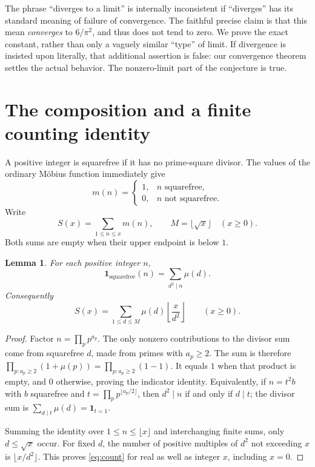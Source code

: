 \documentclass[11pt]{article}
\newtheorem{lemma}[theorem]{Lemma}
\newcommand{\sfcount}{S}
\newcommand{\mm}{m}
\begin{document}
The phrase ``diverges to a limit'' is internally inconsistent if
``diverges'' has its standard meaning of failure of convergence. The
faithful precise claim is that this mean \emph{converges} to $6/\pi^2$,
and thus does not tend to zero. We prove the exact constant, rather than
only a vaguely similar ``type'' of limit. If divergence is insisted upon
literally, that additional assertion is false: our convergence theorem
settles the actual behavior. The nonzero-limit part of the conjecture is
true.

\section{The composition and a finite counting identity}
A positive integer is squarefree if it has no prime-square divisor.
The values of the ordinary M\"obius function immediately give
\begin{equation}\label{eq:indicator}
\mm(n)=\begin{cases}1,&n\text{ squarefree},\\0,&n\text{ not squarefree}.
\end{cases}
\end{equation}
Write
\[
\sfcount(x)=\sum_{1\leq n\leq x}\mm(n),\qquad
M=\lfloor\sqrt{x}\rfloor\quad(x\geq0).
\]
Both sums are empty when their upper endpoint is below $1$.

\begin{lemma}\label{lem:divisor}
For each positive integer $n$,
\[
\mathbf 1_{\mathrm{squarefree}}(n)=\sum_{d^2\mid n}\mu(d).
\]
Consequently
\begin{equation}\label{eq:count}
\sfcount(x)=\sum_{1\leq d\leq M}\mu(d)
             \left\lfloor\frac{x}{d^2}\right\rfloor
\qquad(x\geq0).
\end{equation}
\end{lemma}
\begin{proof}
Factor $n=\prod_p p^{a_p}$. The only nonzero contributions to the divisor
sum come from squarefree $d$, made from primes with $a_p\geq2$.
The sum is therefore
$\prod_{p:a_p\geq2}(1+\mu(p))=\prod_{p:a_p\geq2}(1-1)$.
It equals $1$ when that product is empty, and $0$ otherwise, proving the
indicator identity. Equivalently, if $n=t^2b$ with $b$ squarefree and
$t=\prod_p p^{\lfloor a_p/2\rfloor}$, then $d^2\mid n$ if and only if
$d\mid t$; the divisor sum is $\sum_{d\mid t}\mu(d)=\mathbf1_{t=1}$.

Summing the identity over $1\leq n\leq\lfloor x\rfloor$ and interchanging
finite sums, only $d\leq\sqrt{x}$ occur. For fixed $d$, the number of
positive multiples of $d^2$ not exceeding $x$ is
$\lfloor x/d^2\rfloor$. This proves \eqref{eq:count} for real as well as
integer $x$, including $x=0$.
\end{proof}
\end{document}
